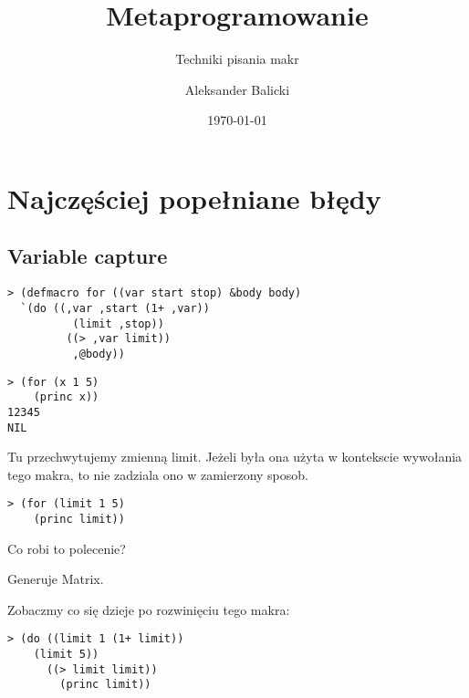 \usepackage[utf8]{inputenc}
\usepackage[]{polski}

\title{Metaprogramowanie}
\subtitle{Techniki pisania makr}
\author{Aleksander Balicki}
\date{\today}


\mode*
\begin{frame}
\titlepage
\end{frame}

\begin{frame}
\tableofcontents[hideallsubsections]
\end{frame}

\section{Najczęściej popełniane błędy}
\subsection{Variable capture} %
\label{sub:Variable capture}
\begin{frame}{}
\end{frame}

\begin{frame}[fragile]{}
\begin{verbatim}
> (defmacro for ((var start stop) &body body)
  `(do ((,var ,start (1+ ,var))
          (limit ,stop))
         ((> ,var limit))
	      ,@body))
\end{verbatim}
\pause
\begin{verbatim}
> (for (x 1 5)
    (princ x))
12345
NIL
\end{verbatim}
\pause
Tu przechwytujemy zmienną limit. Jeżeli była ona użyta w kontekscie wywołania tego makra, to nie zadziala ono w zamierzony sposob.
\end{frame}

\begin{frame}[fragile]{}
\begin{verbatim}
> (for (limit 1 5)
    (princ limit))
\end{verbatim}

Co robi to polecenie?

\pause

Generuje Matrix.

\pause

Zobaczmy co się dzieje po rozwinięciu tego makra:
\begin{verbatim}
> (do ((limit 1 (1+ limit))
    (limit 5))
      ((> limit limit))
        (princ limit))
\end{verbatim}
\end{frame}


